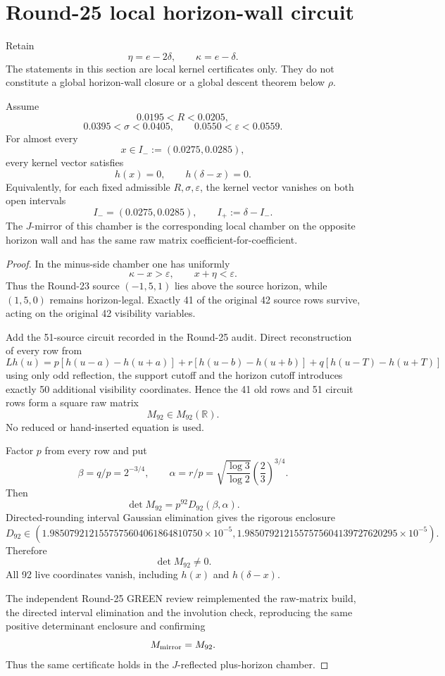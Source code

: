 \section{Round-25 local horizon-wall circuit}
\label{sec:p12-round25-horizon}

Retain
\[
\eta=e-2\delta,\qquad
\kappa=e-\delta.
\]
The statements in this section are local kernel certificates only. They do not
constitute a global horizon-wall closure or a global descent theorem below
\(\rho\).

\begin{proposition}
\label{prop:p12-r25-horizon}
Assume
\[
0.0195<R<0.0205,
\]
\[
0.0395<\sigma<0.0405,\qquad
0.0550<\varepsilon<0.0559.
\]
For almost every
\[
x\in I_-:=(0.0275,0.0285),
\]
every kernel vector satisfies
\[
\boxed{h(x)=0,\qquad h(\delta-x)=0.}
\]
Equivalently, for each fixed admissible \(R,\sigma,\varepsilon\), the kernel
vector vanishes on both open intervals
\[
I_-=(0.0275,0.0285),\qquad
I_+:=\delta-I_-.
\]
The \(J\)-mirror of this chamber is the corresponding local chamber on the
opposite horizon wall and has the same raw matrix coefficient-for-coefficient.
\end{proposition}

\begin{proof}
In the minus-side chamber one has uniformly
\[
\kappa-x>\varepsilon,\qquad
x+\eta<\varepsilon.
\]
Thus the Round-23 source \((-1,5,1)\) lies above the source horizon, while
\((1,5,0)\) remains horizon-legal. Exactly 41 of the original 42 source rows
survive, acting on the original 42 visibility variables.

Add the 51-source circuit recorded in the Round-25 audit. Direct reconstruction
of every row from
\[
Lh(u)=
p[h(u-a)-h(u+a)]
+r[h(u-b)-h(u+b)]
+q[h(u-T)-h(u+T)]
\]
using only odd reflection, the support cutoff and the horizon cutoff introduces
exactly 50 additional visibility coordinates. Hence the 41 old rows and 51
circuit rows form a square raw matrix
\[
\boxed{M_{92}\in M_{92}(\mathbb R).}
\]
No reduced or hand-inserted equation is used.

Factor \(p\) from every row and put
\[
\beta=q/p=2^{-3/4},
\qquad
\alpha=r/p
=\sqrt{\frac{\log3}{\log2}}\left(\frac23\right)^{3/4}.
\]
Then
\[
\det M_{92}=p^{92}D_{92}(\beta,\alpha).
\]
Directed-rounding interval Gaussian elimination gives the rigorous enclosure
\[
D_{92}\in
(
1.9850792121557575604061864810750\times10^{-5},
1.9850792121557575604139727620295\times10^{-5}
).
\]
Therefore
\[
\det M_{92}\ne0.
\]
All 92 live coordinates vanish, including \(h(x)\) and
\(h(\delta-x)\).

The independent Round-25 GREEN review reimplemented the raw-matrix build,
the directed interval elimination and the involution check, reproducing the
same positive determinant enclosure and confirming
\[
M_{\rm mirror}=M_{92}.
\]
Thus the same certificate holds in the \(J\)-reflected plus-horizon chamber.
\end{proof}

